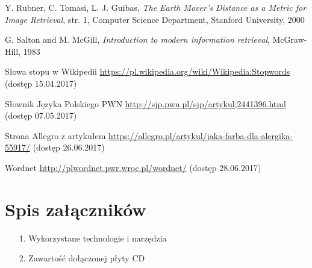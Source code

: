 \documentclass[pl]{minipw} %
\begin{document}
\begin{thebibliography}{30}
		Y. Rubner, C. Tomasi, L. J. Guibas,
		\emph{The Earth Mover's Distance as a Metric for Image Retrieval},
		str. 1,
		Computer Science Department, Stanford University,
		2000	

		G. Salton and M. McGill,
		\emph{Introduction to modern information retrieval},
		McGraw-Hill,
		1983
	
		Słowa stopu w Wikipedii
		\url{https://pl.wikipedia.org/wiki/Wikipedia:Stopwords}
		(dostęp 15.04.2017)
	
		Słownik Języka Polskiego PWN
		\url{http://sjp.pwn.pl/sjp/artykul;2441396.html}
		(dostęp 07.05.2017)
	
		Strona Allegro z artykułem
		\url{https://allegro.pl/artykul/jaka-farba-dla-alergika-55917/}
		(dostęp 26.06.2017)
		
		Wordnet
		\url{http://plwordnet.pwr.wroc.pl/wordnet/}
		(dostęp 28.06.2017)
\end{thebibliography}






\listoffigures


\renewcommand{\listtablename}{Spis tabel}
\listoftables


\chapter*{Spis załączników}
\begin{enumerate}
\item[1.] Wykorzystane technologie i narzędzia
\item[2.] Zawartość dołączonej płyty CD
\end{enumerate}
\end{document}
